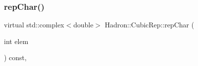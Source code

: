 \mbox{\label{structHadron_1_1CubicRep_af45227106e8e715e84b0af69cd3b36f8}} 
\subsubsection{\texorpdfstring{repChar()}{repChar()}\hspace{0.1cm}{\footnotesize\ttfamily [1/2]}}
{\footnotesize\ttfamily virtual std\+::complex$<$double$>$ Hadron\+::\+Cubic\+Rep\+::rep\+Char (\begin{DoxyParamCaption}\item[{int}]{elem }\end{DoxyParamCaption}) const\hspace{0.3cm}{\ttfamily [inline]}, {\ttfamily [virtual]}}



